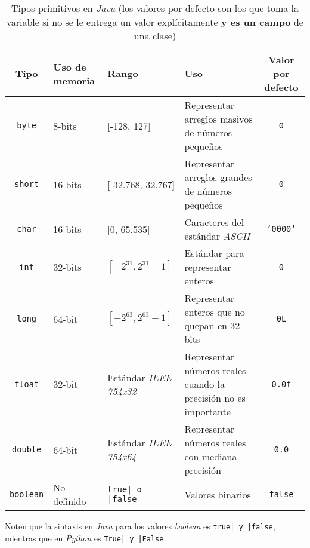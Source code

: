   \begin{table}[ht!]
    \centering
    \begin{tabular}{| c | m{5em} | m{7em} | m{12em} | c |}
      \hline
      Tipo                      & Uso de memoria  & Rango 
        & Uso                                               
        & Valor por defecto           \\
      \hline\hline
      \texttt{byte}     & 8-bits          & [-128, 127]  
        & Representar arreglos masivos de números pequeños  
        & \texttt{0}        \\\hline
      \texttt{short}    & 16-bits         & [-32.768, 32.767]
        & Representar arreglos grandes de números pequeños  
        & \texttt{0}        \\\hline
      \texttt{char}     & 16-bits         & [0, 65.535]
        & Caracteres del estándar \textit{ASCII}            
        & \texttt{'\u0000'} \\\hline
      \texttt{int}      & 32-bits         & \([-2^{31}, 2^{31} - 1]\)
        & Estándar para representar enteros               
        & \texttt{0}        \\\hline
      \texttt{long}     & 64-bit          & \([-2^{63}, 2^{63} - 1]\)
        & Representar enteros que no quepan en 32-bits
        & \texttt{0L}       \\\hline
      \texttt{float}    & 32-bit          & Estándar \textit{IEEE 754x32}
        & Representar números reales cuando la precisión no es importante
        & \texttt{0.0f}     \\\hline
      \texttt{double}   & 64-bit          & Estándar \textit{IEEE 754x64}
        & Representar números reales con mediana precisión
        & \texttt{0.0}      \\\hline
      \texttt{boolean}  & No definido     & \texttt{true| o |false}
        & Valores binarios
        & \texttt{false}    \\
      \hline
    \end{tabular}
    \caption{
      Tipos primitivos en \textit{Java} (los valores por defecto son los que toma la
      variable si no se le entrega un valor explícitamente \textbf{y es un campo} de una
      clase)
    }
    \label{tab:primitive}
  \end{table}

  Noten que la sintaxis en \textit{Java} para los valores \textit{boolean} es 
  \texttt{true| y |false}, mientras que en \textit{Python} es 
  \texttt{True| y |False}.


